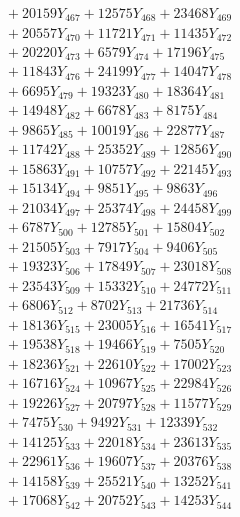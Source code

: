 \documentclass[a4paper,10pt]{article}
\begin{document}
{\begin{align}
&\;  + 20159 Y_{467} + 12575 Y_{468} + 23468 Y_{469} \\[0.3ex]
&\;  + 20557 Y_{470} + 11721 Y_{471} + 11435 Y_{472} \\[0.3ex]
&\;  + 20220 Y_{473} + 6579 Y_{474} + 17196 Y_{475} \\[0.3ex]
&\;  + 11843 Y_{476} + 24199 Y_{477} + 14047 Y_{478} \\[0.5ex]\allowbreak
&\;  + 6695 Y_{479} + 19323 Y_{480} + 18364 Y_{481} \\[0.3ex]
&\;  + 14948 Y_{482} + 6678 Y_{483} + 8175 Y_{484} \\[0.3ex]
&\;  + 9865 Y_{485} + 10019 Y_{486} + 22877 Y_{487} \\[0.3ex]
&\;  + 11742 Y_{488} + 25352 Y_{489} + 12856 Y_{490} \\[0.3ex]
&\;  + 15863 Y_{491} + 10757 Y_{492} + 22145 Y_{493} \\[0.3ex]
&\;  + 15134 Y_{494} + 9851 Y_{495} + 9863 Y_{496} \\[0.3ex]
&\;  + 21034 Y_{497} + 25374 Y_{498} + 24458 Y_{499} \\[0.3ex]
&\;  + 6787 Y_{500} + 12785 Y_{501} + 15804 Y_{502} \\[0.3ex]
&\;  + 21505 Y_{503} + 7917 Y_{504} + 9406 Y_{505} \\[0.3ex]
&\;  + 19323 Y_{506} + 17849 Y_{507} + 23018 Y_{508} \\[0.5ex]\allowbreak
&\;  + 23543 Y_{509} + 15332 Y_{510} + 24772 Y_{511} \\[0.3ex]
&\;  + 6806 Y_{512} + 8702 Y_{513} + 21736 Y_{514} \\[0.3ex]
&\;  + 18136 Y_{515} + 23005 Y_{516} + 16541 Y_{517} \\[0.3ex]
&\;  + 19538 Y_{518} + 19466 Y_{519} + 7505 Y_{520} \\[0.3ex]
&\;  + 18236 Y_{521} + 22610 Y_{522} + 17002 Y_{523} \\[0.3ex]
&\;  + 16716 Y_{524} + 10967 Y_{525} + 22984 Y_{526} \\[0.3ex]
&\;  + 19226 Y_{527} + 20797 Y_{528} + 11577 Y_{529} \\[0.3ex]
&\;  + 7475 Y_{530} + 9492 Y_{531} + 12339 Y_{532} \\[0.3ex]
&\;  + 14125 Y_{533} + 22018 Y_{534} + 23613 Y_{535} \\[0.3ex]
&\;  + 22961 Y_{536} + 19607 Y_{537} + 20376 Y_{538} \\[0.5ex]\allowbreak
&\;  + 14158 Y_{539} + 25521 Y_{540} + 13252 Y_{541} \\[0.3ex]
&\;  + 17068 Y_{542} + 20752 Y_{543} + 14253 Y_{544} \\[0.3ex]

\end{align}}
\end{document}

